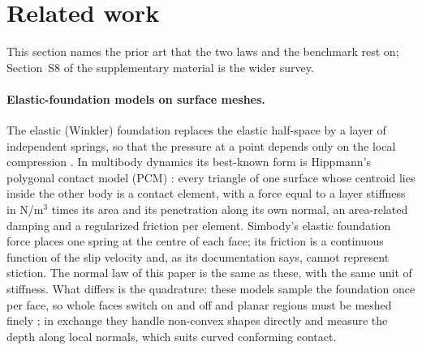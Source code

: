 \section{Related work}\label{sec:related}


This section names the prior art that the two laws and the benchmark rest on; Section~S8 of the
supplementary material is the wider survey.

\paragraph{Elastic-foundation models on surface meshes.} The elastic (Winkler) foundation
replaces the elastic half-space by a layer of independent springs, so that the pressure at a
point depends only on the local compression \cite{Johnson1985}. In multibody dynamics its
best-known form is Hippmann's polygonal contact model (PCM) \cite{Hippmann2004,Hippmann2024}:
every triangle of one surface whose centroid lies inside the other body is a contact element,
with a force equal to a layer stiffness in N/m$^3$ times its area and its penetration along its
own normal, an area-related damping and a regularized friction per element. Simbody's elastic
foundation force \cite{Sherman2011,SimbodyEFF} places one spring at the centre of each face;
its friction is a continuous function of the slip velocity and, as its documentation says,
cannot represent stiction. The normal law of this paper is the same as these, with the same
unit of stiffness. What differs is the quadrature: these models sample the foundation once per
face, so whole faces switch on and off and planar regions must be meshed finely
\cite{Hippmann2024}; in exchange they handle non-convex shapes directly and measure the depth
along local normals, which suits curved conforming contact.

